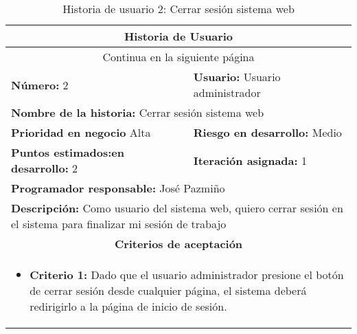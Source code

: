 \begin{longtable}{|p{6.7cm}|p{6.7cm}|}
    \caption{Historia de usuario 2: Cerrar sesión sistema web} \label{tab:historia-2}
    \\
    \hline
    \multicolumn{2}{|c|}{\textbf{Historia de Usuario}}                                                                                                       \\
    \hline

    \endfirsthead

    \hline
    \endhead

    \hline
    \multicolumn{2}{|c|}{{Continua en la siguiente página}}                                                                                                  \\
    \hline
    \endfoot

    \hline
    \endlastfoot

    \textbf{Número:} 2                                  & \textbf{Usuario:} Usuario administrador                                                            \\
    \hline
    \multicolumn{2}{|l|}{\textbf{Nombre de la historia:} Cerrar sesión sistema web}                                                                          \\
    \hline
    \textbf{Prioridad en negocio}  Alta                 & \textbf{Riesgo en desarrollo:} Medio                                                               \\
    \hline
    \textbf{\textbf{Puntos estimados:}en desarrollo:} 2 & \textbf{Iteración asignada:} 1                                                                     \\
    \hline
    \multicolumn{2}{|l|}{\textbf{Programador responsable:} José Pazmiño }                                                                                    \\
    \hline
    \multicolumn{2}{|p{13.4cm}|}{\textbf{Descripción:} Como usuario del sistema web, quiero cerrar sesión en el sistema para finalizar mi sesión de trabajo} \\
    \hline
    \multicolumn{2}{|c|}{\textbf{Criterios de aceptación}}                                                                                                   \\
    \hline
    \multicolumn{2}{|p{13.4cm}|}{
    \begin{itemize}[label={},leftmargin=*, nosep]
        \item \textbf{Criterio 1:} Dado que el usuario administrador presione el botón de cerrar sesión desde cualquier página, el sistema deberá redirigirlo a la página de inicio de sesión.
    \end{itemize}
    }                                                                                                                                                        \\
\end{longtable}



